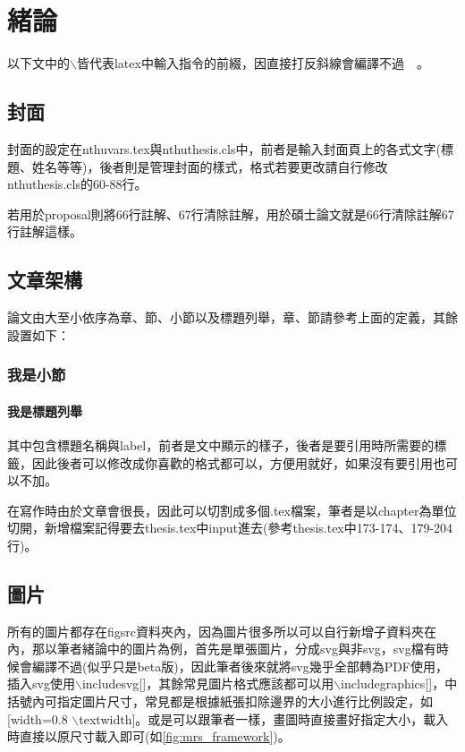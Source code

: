 \chapter{緒論}
\label{c:introduction}

以下文中的$\backslash$皆代表latex中輸入指令的前綴，因直接打反斜線會編譯不過~~。

\section{封面}
\label{sec:cover}

封面的設定在nthuvars.tex與nthuthesis.cls中，前者是輸入封面頁上的各式文字(標題、姓名等等)，後者則是管理封面的樣式，格式若要更改請自行修改nthuthesis.cls的60-88行。

若用於proposal則將66行註解、67行清除註解，用於碩士論文就是66行清除註解67行註解這樣。

\section{文章架構}
\label{sec:architecture}

論文由大至小依序為章、節、小節以及標題列舉，章、節請參考上面的定義，其餘設置如下：

\subsection{我是小節}
\label{subsec:subsection}

\subsubsection{我是標題列舉}
\label{subsubsec:subsubsection}

其中包含標題名稱與label，前者是文中顯示的樣子，後者是要引用時所需要的標籤，因此後者可以修改成你喜歡的格式都可以，方便用就好，如果沒有要引用也可以不加。

在寫作時由於文章會很長，因此可以切割成多個.tex檔案，筆者是以chapter為單位切開，新增檔案記得要去thesis.tex中input進去(參考thesis.tex中173-174、179-204行)。

\section{圖片}
\label{sec:fig}

所有的圖片都存在figsrc資料夾內，因為圖片很多所以可以自行新增子資料夾在內，那以筆者緒論中的圖片為例，首先是單張圖片，分成svg與非svg，svg檔有時候會編譯不過(似乎只是beta版)，因此筆者後來就將svg幾乎全部轉為PDF使用，插入svg使用$\backslash$includesvg{}[]，其餘常見圖片格式應該都可以用$\backslash$includegraphics{}[]，中括號內可指定圖片尺寸，常見都是根據紙張扣除邊界的大小進行比例設定，如[width=0.8 $\backslash$textwidth]。或是可以跟筆者一樣，畫圖時直接畫好指定大小，載入時直接以原尺寸載入即可(如\cref{fig:mrs_framework})。

